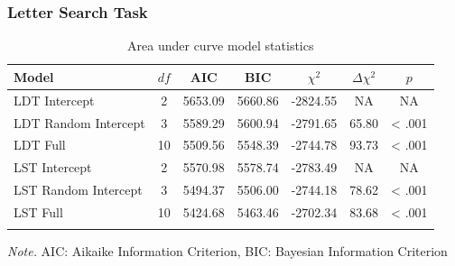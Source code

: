 \documentclass[english,man]{apa6}
\theoremstyle{definition}
\theoremstyle{definition}
\theoremstyle{definition}
\theoremstyle{remark}
\begin{document}
\subsubsection{Letter Search Task}\label{letter-search-task}

\begin{table}[tbp]
\begin{center}
\begin{threeparttable}
\caption{\label{tab:area-table-model}Area under curve model statistics}
\begin{tabular}{lcccccc}
\toprule
Model & $df$ & AIC & BIC & $\chi^2$ & $\Delta\chi^2$ & $p$\\
\midrule
LDT Intercept & 2 & 5653.09 & 5660.86 & -2824.55 & NA & NA\\
LDT Random Intercept & 3 & 5589.29 & 5600.94 & -2791.65 & 65.80 & < .001\\
LDT Full & 10 & 5509.56 & 5548.39 & -2744.78 & 93.73 & < .001\\
LST Intercept & 2 & 5570.98 & 5578.74 & -2783.49 & NA & NA\\
LST Random Intercept & 3 & 5494.37 & 5506.00 & -2744.18 & 78.62 & < .001\\
LST Full & 10 & 5424.68 & 5463.46 & -2702.34 & 83.68 & < .001\\
\bottomrule
\addlinespace
\end{tabular}
\begin{tablenotes}[para]
\textit{Note.} AIC: Aikaike Information Criterion, BIC: Bayesian Information Criterion
\end{tablenotes}
\end{threeparttable}
\end{center}
\end{table}
\end{document}
